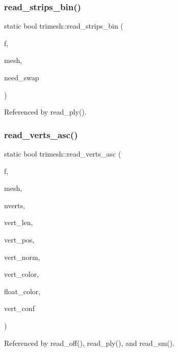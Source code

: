 \subsubsection{\texorpdfstring{read\+\_\+strips\+\_\+bin()}{read\_strips\_bin()}}
{\footnotesize\ttfamily static bool trimesh\+::read\+\_\+strips\+\_\+bin (\begin{DoxyParamCaption}\item[{F\+I\+LE $\ast$}]{f,  }\item[{\hyperlink{classtrimesh_1_1TriMesh}{Tri\+Mesh} $\ast$}]{mesh,  }\item[{bool}]{need\+\_\+swap }\end{DoxyParamCaption})\hspace{0.3cm}{\ttfamily [static]}}



Referenced by read\+\_\+ply().

\mbox{\label{namespacetrimesh_abcd71712bff6c4ee8c3fc4627ed6a292}} 
\subsubsection{\texorpdfstring{read\+\_\+verts\+\_\+asc()}{read\_verts\_asc()}}
{\footnotesize\ttfamily static bool trimesh\+::read\+\_\+verts\+\_\+asc (\begin{DoxyParamCaption}\item[{F\+I\+LE $\ast$}]{f,  }\item[{\hyperlink{classtrimesh_1_1TriMesh}{Tri\+Mesh} $\ast$}]{mesh,  }\item[{int}]{nverts,  }\item[{int}]{vert\+\_\+len,  }\item[{int}]{vert\+\_\+pos,  }\item[{int}]{vert\+\_\+norm,  }\item[{int}]{vert\+\_\+color,  }\item[{bool}]{float\+\_\+color,  }\item[{int}]{vert\+\_\+conf }\end{DoxyParamCaption})\hspace{0.3cm}{\ttfamily [static]}}



Referenced by read\+\_\+off(), read\+\_\+ply(), and read\+\_\+sm().

\mbox{\label{namespacetrimesh_a89396ced1b73814bb870a9541b94b9d4}} 
